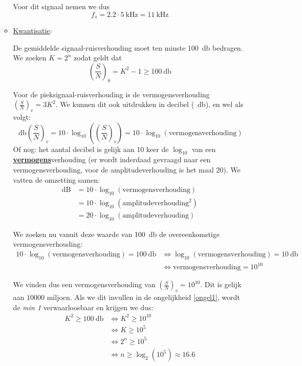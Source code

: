 \documentclass[kulak]{kulakarticle}
\begin{document}
\begin{enumerate}
\begin{itemize}
			Voor dit signaal nemen we dus \[ f_s = 2.2\cdot \SI{5}{\kilo\hertz}=\boxed{\SI{11}{\kilo\hertz}} \]
			\item \underline{Kwantisatie}:

			De gemiddelde signaal-ruisverhouding moet ten minste \SI{100}{\decibel} bedragen. We zoeken \(K=2^n\) zodat geldt dat
			\begin{equation}
				\left(\frac{S}{N}\right)_0=K^2-1\geq \SI{100}{\decibel} \label{ongel1}
			\end{equation}

			Voor de pieksignaal-ruisverhouding is de vermogensverhouding \( \left(\frac{S}{N}\right)_v = 3K^2 \). We kunnen dit ook uitdrukken in decibel (\SI{}{\decibel}), en wel als volgt: \[\SI{}{\decibel}\left(\frac{S}{N}\right)_v = 10\cdot \log_{10}\left(\left(\frac{S}{N}\right)_v\right) = 10 \cdot \log_{10}(\text{vermogensverhouding})\] Of nog: het aantal decibel is gelijk aan 10 keer de \( \log_{10} \) van een \underline{\textbf{vermogens}}verhouding (er wordt inderdaad gevraagd naar een vermogensverhouding, voor de amplitudeverhouding is het maal 20). We vatten de omzetting samen:
			\begin{equation*}
				\begin{split}
					\text{dB} &= 10 \cdot \log_{10}(\text{vermogensverhouding}) \\
					&= 10 \cdot \log_{10}(\text{amplitudeverhouding}^2) \\
					&= 20 \cdot \log_{10}(\text{amplitudeverhouding})
				\end{split}
			\end{equation*}

			We zoeken nu vanuit deze waarde van \SI{100}{\decibel} de overeenkomstige vermogensverhouding:
			\begin{equation*}
				\begin{split}
					10 \cdot \log_{10}(\text{vermogensverhouding}) = \SI{100}{\decibel} &\Leftrightarrow \log_{10}(\text{vermogensverhouding}) = \SI{10}{\decibel} \\
					& \Leftrightarrow \text{vermogensverhouding} = 10^{10}
				\end{split}
			\end{equation*}

			We vinden dus een vermogensverhouding van \( \left(\frac{S}{N}\right)_v = 10^{10} \). Dit is gelijk aan \( 10000 \) miljoen. Als we dit invullen in de ongelijkheid \ref{ongel1}, wordt de \textit{min 1} verwaarloosbaar en krijgen we dus:
			\begin{equation*}
				\begin{split}
					K^2\geq \SI{100}{\decibel} &\Leftrightarrow K^2 \geq 10^{10} \\
					& \Leftrightarrow K \geq 10^5 \\
					& \Leftrightarrow 2^n \geq 10^5 \\
					& \Leftrightarrow n \geq \log_2(10^5)\approx 16.6
				\end{split}
			\end{equation*}


\end{itemize}
\end{enumerate}
\end{document}
